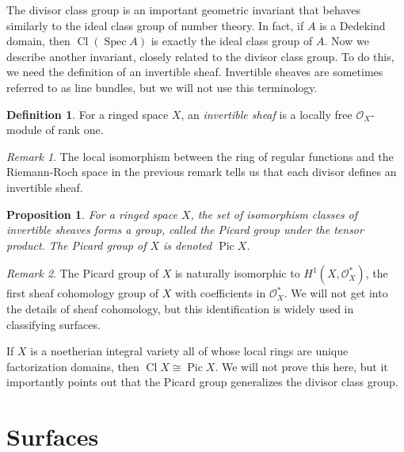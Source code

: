 \documentclass[12pt,twoside]{reedthesis}
\theoremstyle{plain}
\newtheorem{proposition}[theorem]{Proposition}
\theoremstyle{definition}
\newtheorem{definition}{Definition}[section]
\theoremstyle{remark}
\newtheorem{remark}{Remark}[section]
\newcommand{\calO}{\mathcal{O}}
\newcommand{\Cl}{\operatorname{Cl}}
\newcommand{\Spec}{\operatorname{Spec}}
\newcommand{\Pic}{\operatorname{Pic}}
\begin{document}
The divisor class group is an important geometric invariant that behaves similarly to the ideal class group of number theory. In fact, if $A$ is a Dedekind domain, then $\Cl(\Spec A)$ is exactly the ideal class group of $A$. Now we describe another invariant, closely related to the divisor class group. To do this, we need the definition of an invertible sheaf. Invertible sheaves are sometimes referred to as line bundles, but we will not use this terminology.
\begin{definition}
For a ringed space $X$, an \emph{invertible sheaf} is a locally free $\calO_X$-module of rank one.
\end{definition}
\begin{remark}
The local isomorphism between the ring of regular functions and the Riemann-Roch space in the previous remark tells us that each divisor defines an invertible sheaf.
\end{remark}
\begin{proposition}
For a ringed space $X$, the set of isomorphism classes of invertible sheaves forms a group, called the \emph{Picard group} under the tensor product. The Picard group of $X$ is denoted $\Pic X$.
\end{proposition}
\begin{remark}
The Picard group of $X$ is naturally isomorphic to $H^1(X,\calO_X^*)$, the first sheaf cohomology group of $X$ with coefficients in $\calO_X^*$. We will not get into the details of sheaf cohomology, but this identification is widely used in classifying surfaces.
\end{remark}
\noindent If $X$ is a noetherian integral variety all of whose local rings are unique factorization domains, then $\Cl X\cong \Pic X$. We will not prove this here, but it importantly points out that the Picard group generalizes the divisor class group.

\section{Surfaces}
\end{document}
